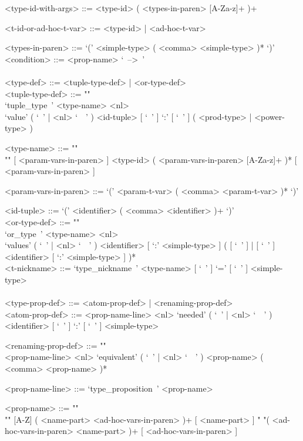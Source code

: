 \documentclass{article}
\begin{document}
\begin{grammar}
<type-id-with-args> ::= <type-id> ( <types-in-paren> [A-Za-z]+ )+

<t-id-or-ad-hoc-t-var> ::= <type-id> | <ad-hoc-t-var>

<types-in-paren> ::= `(' <simple-type> ( <comma> <simple-type> )* `)'
\\

<condition> ::= <prop-name> `\ -->\ ' 
\\
\\

<type-def> ::= <tuple-type-def> | <or-type-def>
\\

<tuple-type-def> ::= ""\\
`tuple_type\ ' <type-name> <nl> \\
`value' ( `\ ' | <nl> `\ \ ' )
<id-tuple> [ `\ ' ] `:' [ `\ ' ] ( <prod-type> | <power-type> )

<type-name> ::= ""\\""
[ <param-vars-in-paren> ] <type-id> ( <param-vars-in-paren> [A-Za-z]+ )*
[ <param-vars-in-paren> ]

<param-vars-in-paren> ::= `(' <param-t-var> ( <comma> <param-t-var> )* `)'

<id-tuple> ::= `(' <identifier> ( <comma> <identifier> )+ `)'
\\

<or-type-def> ::= ""\\
`or_type\ ' <type-name> <nl> \\
`values' ( `\ ' | <nl> `\ \ ' ) <identifier> [ `:' <simple-type> ]
( [ `\ ' ] | [ `\ ' ] <identifier> [ `:' <simple-type> ] )*
\\

<t-nickname> ::= `type_nickname\ ' <type-name> [ `\ ' ] `=' [ `\ ' ] <simple-type>
\\\\

<type-prop-def> ::= <atom-prop-def> | <renaming-prop-def>
\\

<atom-prop-def> ::=
<prop-name-line> <nl>
`needed' ( `\ ' | <nl> `\ \ ' ) <identifier> [ `\ ' ] `:' [ `\ ' ] <simple-type>

<renaming-prop-def> ::= ""\\
<prop-name-line> <nl>
`equivalent' ( `\ ' | <nl> `\ \ ' ) <prop-name> ( <comma> <prop-name> )*

<prop-name-line> ::= `type_proposition\ ' <prop-name>

<prop-name> ::=  ""\\""
[A-Z] ( <name-part> <ad-hoc-vars-in-paren> )+ [ <name-part> ]
\alt " "( <ad-hoc-vars-in-paren> <name-part> )+ [ <ad-hoc-vars-in-paren> ]


\end{grammar}
\end{document}
